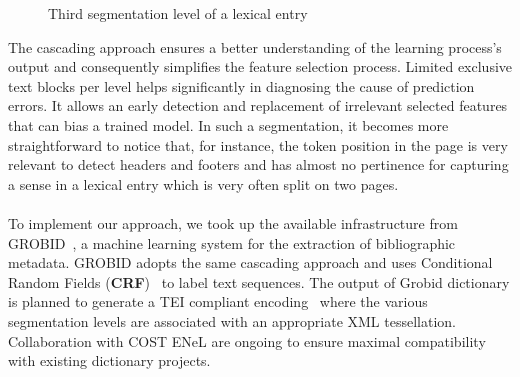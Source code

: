 \documentclass[twocolumn,a4paper]{article}
\begin{document}
\begin{figure}
\caption{Third segmentation level of a lexical entry~\cite{larousse1975france}\label{fig:mouseover}}
\end{figure}  
 
 The cascading approach ensures a better understanding of the learning process’s output and consequently simplifies the feature selection process. Limited exclusive text blocks per level helps significantly in diagnosing the cause of prediction errors. It allows an early detection and replacement of irrelevant selected features that can bias a trained model. In such a segmentation, it becomes more straightforward to notice that, for instance, the token position in the page is very relevant to detect headers and footers and has almost no pertinence for capturing a sense in a lexical entry which is very often split on two pages.
  




\paragraph{}To implement our approach, we took up the available infrastructure from GROBID~\cite{Lopez2015GROBIDI}, a machine learning system for the extraction of bibliographic metadata. GROBID adopts the same cascading approach and uses Conditional Random Fields (\textbf{CRF})~\cite{lavergne2010practical} to label text sequences. The output of Grobid dictionary is planned to generate a TEI compliant encoding~\cite{budin2012creating,romary:hal-00704511} where the various segmentation levels are associated with an appropriate XML tessellation. Collaboration with COST ENeL are ongoing to ensure maximal compatibility with existing dictionary projects.
 
\end{document}
